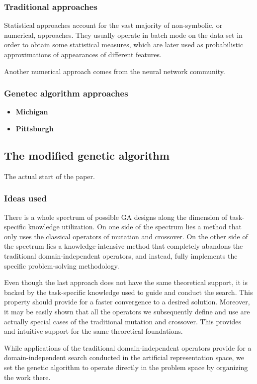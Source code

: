 \documentclass[12pt]{article}
\begin{document}
\subsubsection{Traditional approaches}
Statistical approaches account for the vast majority of non-symbolic, or numerical, approaches. They usually operate in batch mode on the data set in order to obtain some statistical measures, which are later used as probabilistic approximations of appearances of different features.

Another numerical approach comes from the neural network community.

\subsubsection{Genetec algorithm approaches}
\begin{itemize}
\item \textbf{Michigan}
\item \textbf{Pittsburgh}
\end{itemize}

\subsection{The modified genetic algorithm}
The actual start of the paper.

\subsubsection{Ideas used}
There is a whole spectrum of possible GA designs along the dimension of task-specific knowledge utilization. On one side of the spectrum lies a method that only uses the classical operators of mutation and crossover. On the other side of the spectrum lies a knowledge-intensive method that completely abandons the traditional domain-independent operators, and instead, fully implements the specific problem-solving methodology.

Even though the last approach does not have the same theoretical support, it is backed by the task-specific knowledge used to guide and conduct the search. This property should provide for a faster convergence to a desired solution. Moreover, it may be easily shown that all the operators we subsequently define and use are actually special cases of the traditional mutation and crossover. This provides and intuitive support for the same theoretical foundations.

While applications of the traditional domain-independent operators provide for a domain-independent search conducted in the artificial representation space, we set the genetic algorithm to operate directly in the problem space by organizing the work there.
\end{document}
